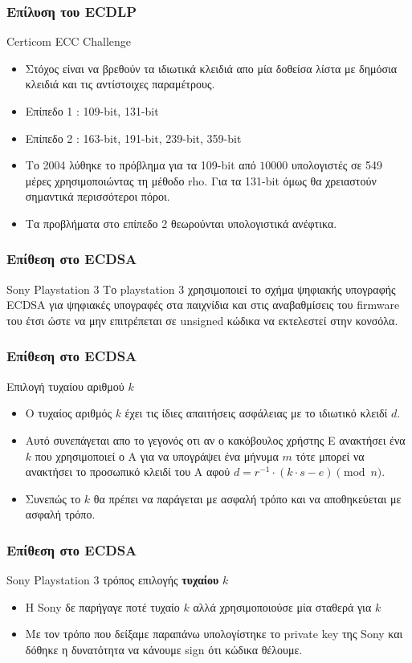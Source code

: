 \documentclass{beamer}
\begin{document}
%
\begin{frame}
\frametitle{Επίλυση του ECDLP}
\begin{block}
{Certicom ECC Challenge}
\begin{itemize}
\item Στόχος είναι να βρεθούν τα ιδιωτικά κλειδιά απο μία δοθείσα λίστα με δημόσια κλειδιά και τις αντίστοιχες παραμέτρους.
\item Επίπεδο 1 : 109-bit, 131-bit
\item Επίπεδο 2 : 163-bit, 191-bit, 239-bit, 359-bit
\item Το 2004 λύθηκε το πρόβλημα για τα 109-bit από $10000$ υπολογιστές σε 549 μέρες χρησιμοποιώντας τη μέθοδο rho. Για τα 131-bit όμως θα χρειαστούν σημαντικά περισσότεροι πόροι.
\item Τα προβλήματα στο επίπεδο 2 θεωρούνται υπολογιστικά ανέφτικα.
\end{itemize}
\end{block}
\end{frame}

%
\begin{frame}
\frametitle{Επίθεση στο ECDSA}
\begin{block}
{Sony Playstation 3}
Το playstation 3 χρησιμοποιεί το σχήμα ψηφιακής υπογραφής ECDSA για ψηφιακές υπογραφές στα παιχνίδια και στις αναβαθμίσεις του firmware του έτσι ώστε να μην επιτρέπεται σε unsigned κώδικα να εκτελεστεί στην κονσόλα.
\end{block}
\end{frame}

%
\begin{frame}
\frametitle{Επίθεση στο ECDSA}
\begin{block}
{Επιλογή τυχαίου αριθμού $k$}
\begin{itemize}
\item Ο τυχαίος αριθμός $k$ έχει τις ίδιες απαιτήσεις ασφάλειας με το ιδιωτικό κλειδί $d$. 
\item Αυτό συνεπάγεται απο το γεγονός οτι αν ο κακόβουλος χρήστης Ε ανακτήσει ένα $k$ που χρησιμοποιεί ο Α για να υπογράψει ένα μήνυμα $m$ τότε μπορεί να ανακτήσει το προσωπικό κλειδί του A αφού $d = r^{-1} \cdot (k \cdot s - e) \pmod n$.
\item Συνεπώς το $k$ θα πρέπει να παράγεται με ασφαλή τρόπο και να αποθηκεύεται με ασφαλή τρόπο.
\end{itemize}
\end{block}
\end{frame}

%
\begin{frame}
\frametitle{Επίθεση στο ECDSA}
\begin{block}
{Sony Playstation 3 τρόπος επιλογής \textbf{τυχαίου} $k$}
\begin{itemize}
\item Η Sony δε παρήγαγε ποτέ τυχαίο $k$ αλλά χρησιμοποιούσε μία σταθερά για $k$
\item Με τον τρόπο που δείξαμε παραπάνω υπολογίστηκε το private key της Sony και δόθηκε η δυνατότητα να κάνουμε sign ότι κώδικα θέλουμε. \cite{PS3}
\end{itemize}
\end{block}
\end{frame}
 
\end{document}
